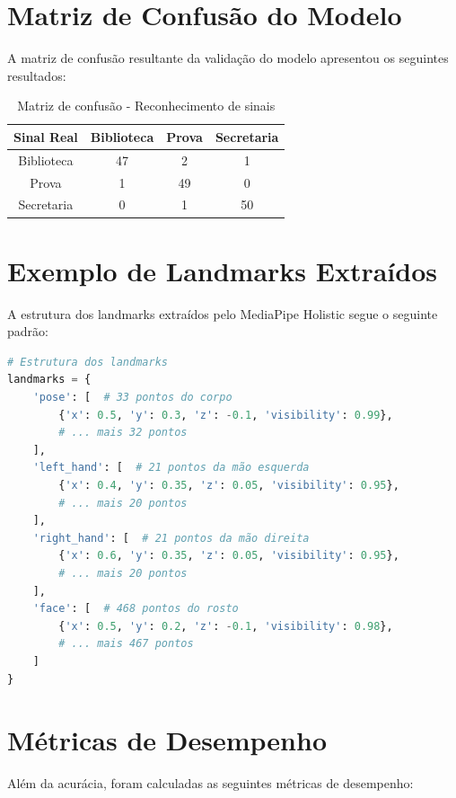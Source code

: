 \section{Matriz de Confusão do Modelo}

A matriz de confusão resultante da validação do modelo apresentou os seguintes resultados:

\begin{table}[htb]
    \centering
    \caption{Matriz de confusão - Reconhecimento de sinais}
    \label{tab:matriz_confusao}
    \begin{tabular}{|c|c|c|c|}
        \hline
        \textbf{Sinal Real} & \textbf{Biblioteca} & \textbf{Prova} & \textbf{Secretaria} \\
        \hline
        Biblioteca & 47 & 2 & 1 \\
        Prova & 1 & 49 & 0 \\
        Secretaria & 0 & 1 & 50 \\
        \hline
    \end{tabular}
\end{table}

\section{Exemplo de Landmarks Extraídos}

A estrutura dos landmarks extraídos pelo MediaPipe Holistic segue o seguinte padrão:

\begin{lstlisting}[language=Python]
# Estrutura dos landmarks
landmarks = {
    'pose': [  # 33 pontos do corpo
        {'x': 0.5, 'y': 0.3, 'z': -0.1, 'visibility': 0.99},
        # ... mais 32 pontos
    ],
    'left_hand': [  # 21 pontos da mão esquerda
        {'x': 0.4, 'y': 0.35, 'z': 0.05, 'visibility': 0.95},
        # ... mais 20 pontos
    ],
    'right_hand': [  # 21 pontos da mão direita
        {'x': 0.6, 'y': 0.35, 'z': 0.05, 'visibility': 0.95},
        # ... mais 20 pontos
    ],
    'face': [  # 468 pontos do rosto
        {'x': 0.5, 'y': 0.2, 'z': -0.1, 'visibility': 0.98},
        # ... mais 467 pontos
    ]
}
\end{lstlisting}

\section{Métricas de Desempenho}

Além da acurácia, foram calculadas as seguintes métricas de desempenho:

